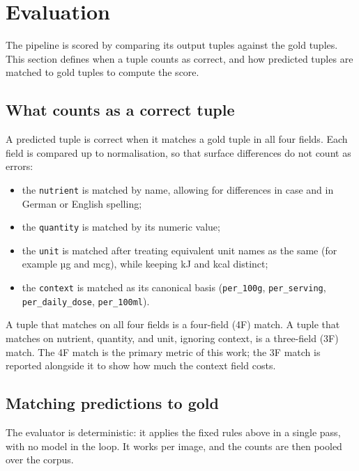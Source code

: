 \FloatBarrier



\section{Evaluation}\label{sec:evaluation}
 
The pipeline is scored by comparing its output tuples against the gold
tuples. This section defines when a tuple counts as correct, and how
predicted tuples are matched to gold tuples to compute the score.
 
\subsection{What counts as a correct tuple}\label{sec:metric}
 
A predicted tuple is correct when it matches a gold tuple in all four
fields. Each field is compared up to normalisation, so that surface
differences do not count as errors:
\begin{itemize}
  \item the \texttt{nutrient} is matched by name, allowing for differences in
        case and in German or English spelling;
  \item the \texttt{quantity} is matched by its numeric value;
  \item the \texttt{unit} is matched after treating equivalent unit names as
        the same (for example µg and mcg), while keeping kJ and kcal
        distinct;
  \item the \texttt{context} is matched as its canonical basis
        (\texttt{per\_100g}, \texttt{per\_serving}, \texttt{per\_daily\_dose},
        \texttt{per\_100ml}).
\end{itemize}
 
A tuple that matches on all four fields is a four-field (4F) match. A tuple
that matches on nutrient, quantity, and unit, ignoring context, is a
three-field (3F) match. The 4F match is the primary metric of this work; the
3F match is reported alongside it to show how much the context field costs.
 
\subsection{Matching predictions to gold}\label{sec:protocol}
 
The evaluator is deterministic: it applies the fixed rules above in a single
pass, with no model in the loop. It works per image, and the counts are then
pooled over the corpus.
 
